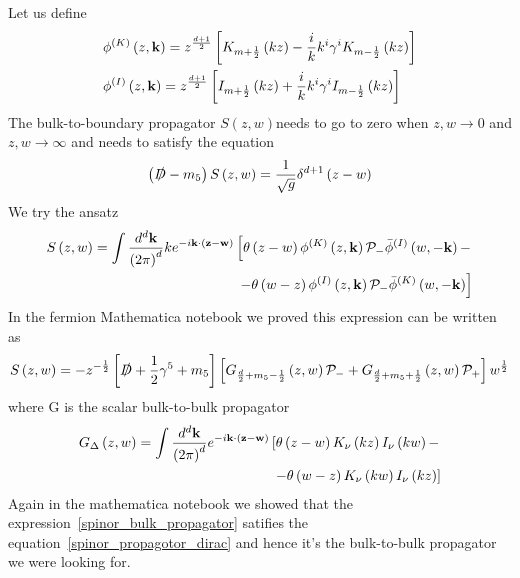 \documentclass[12pt,a4paper]{article}
\begin{document}
Let us define 
\begin{align}
    &\phi^{\left( K \right)} \left(z, \mathbf{k} \right) = z^{\frac{d+1}{2}} \left[ K_{m+\frac{1}{2}} \left( k z \right) - \frac{i}{k} k^i \gamma^i K_{m-\frac{1}{2}} \left( k z \right)  \right] \\
    &\phi^{\left( I \right)} \left(z, \mathbf{k} \right) = z^{\frac{d+1}{2}} \left[ I_{m+\frac{1}{2}} \left( k z \right) + \frac{i}{k} k^i \gamma^i I_{m-\frac{1}{2}} \left( k z \right)  \right] \notag
\end{align}
The bulk-to-boundary propagator $ S \left(z, w \right) $needs to go to zero when $z, w \rightarrow 0$ and $z, w \rightarrow \infty $ and needs to satisfy the equation
\begin{align}
    \left(\slashed{D} - m_5\right) S\left(z,w\right) = \frac{1}{\sqrt{g}} \delta^{d+1} \left( z - w \right)
\label{spinor_propagotor_dirac}
\end{align}
We try the ansatz
\begin{align}
    S \left(z, w \right) = \int \frac{d^d \mathbf{k}}{{\left(2\pi\right)}^d} k e^{- i \mathbf{k}\cdot \left(\mathbf{z}-\mathbf{w}\right)} \left[ \theta \left( z - w \right)  \phi^{\left( K \right)} \left(z, \mathbf{k} \right) \mathcal{P}_{-} \bar{\phi}^{\left( I \right)} \left(w, -\mathbf{k} \right) - \right. \\  
    \left. - \theta\left( w - z \right) \phi^{\left( I \right)} \left(z, \mathbf{k} \right) \mathcal{P}_{-} \bar{\phi}^{\left( K \right)}\left(w, -\mathbf{k} \right) \right] \notag
\end{align}
In the fermion Mathematica notebook we proved this expression can be written as
\begin{align}
    S \left(z, w \right) = - z^{-\frac{1}{2}} \left[ \slashed{D} + \frac{1}{2}\gamma^5+ m_5 \right] \left[ G_{\frac{d}{2}+m_5 - \frac{1}{2}} \left(z,w\right) \mathcal{P}_{-} + G_{\frac{d}{2}+m_5 +\frac{1}{2}} \left(z,w\right) \mathcal{P}_{+}\right] w^{\frac{1}{2}}
\label{spinor_bulk_propagator}
\end{align}
where G is the scalar bulk-to-bulk propagator
\begin{align}
    G_{\Delta} \left(z, w \right) = \int \frac{d^d \mathbf{k}}{{\left(2\pi\right)}^d}  e^{- i \mathbf{k}\cdot \left(\mathbf{z}-\mathbf{w}\right)} \left[ \theta \left( z - w \right) K_{\nu} \left( k z \right) I_\nu \left( k w \right) - \right. \\  
    \left. - \theta\left( w - z \right) K_{\nu} \left( k w \right) I_\nu \left( k z \right) \right] \notag
\label{scalar_propagator}
\end{align}
Again in the mathematica notebook we showed that the expression~\ref{spinor_bulk_propagator} satifies the equation~\ref{spinor_propagotor_dirac} and hence it's the bulk-to-bulk propagator we were looking for.
\end{document}
